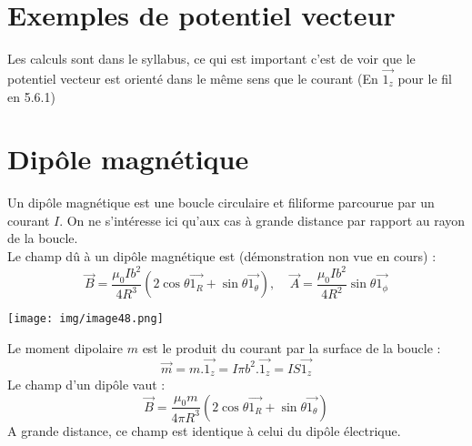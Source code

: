 \documentclass	[11pt, a4paper, openany]{book}
\begin{document}
\section{Exemples de potentiel vecteur}
Les calculs sont dans le syllabus, ce qui est important c'est de voir que le potentiel vecteur est orienté dans le même sens que le courant (En $\vec{1_z}$ pour le fil en 5.6.1) 

\section{Dipôle magnétique}
Un dipôle magnétique est une boucle circulaire et filiforme parcourue par un courant $I$. On ne s'intéresse ici qu'aux cas à grande distance par rapport au rayon de la boucle.\\
Le champ dû à un dipôle magnétique est (démonstration non vue en cours) :
\begin{equation}
\vec{B} = \frac{\mu_0 Ib^2}{4R^3}(2\cos\theta \vec{1_R} + \sin\theta \vec{1_\theta}),\ \ \ \ \ \vec{A} = \frac{\mu_0 I b^2}{4R^2}\sin\theta\vec{1_\phi}
\end{equation}
\begin{center}
\texttt{[image: img/image48.png]}
\end{center}
Le moment dipolaire $m$ est le produit du courant par la surface de la boucle :
\begin{equation}
\vec{m} = m.\vec{1_z} = I\pi b^2.\vec{1_z} = IS\vec{1_z}
\end{equation}
Le champ d'un dipôle vaut :
\begin{equation}
\vec{B} = \frac{\mu_0 m}{4\pi R^3}(2\cos\theta\vec{1_R} + \sin\theta \vec{1_\theta})
\end{equation}
A grande distance, ce champ est identique à celui du dipôle électrique.
\end{document}
